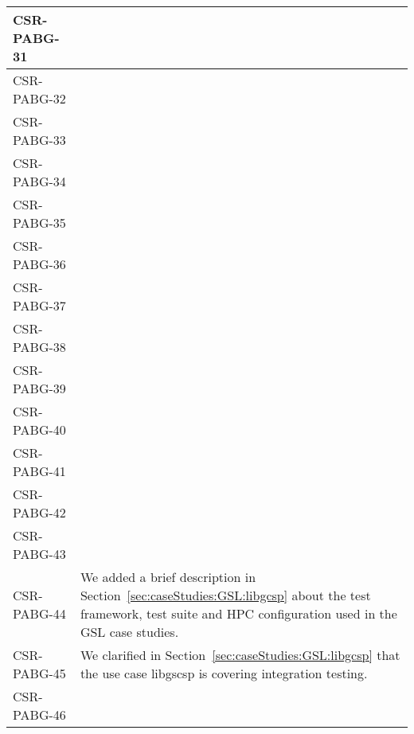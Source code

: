 \begin{longtable}{|p{1.5cm}|p{12cm}|@{}}
\hline
CSR-PABG-31&
\begin{minipage}{12cm}
\end{minipage}\\
\hline
CSR-PABG-32&
\begin{minipage}{12cm}
\end{minipage}\\
\hline
CSR-PABG-33&
\begin{minipage}{12cm}
\end{minipage}\\
\hline
CSR-PABG-34&
\begin{minipage}{12cm}
\end{minipage}\\
\hline
CSR-PABG-35&
\begin{minipage}{12cm}
\end{minipage}\\
\hline
CSR-PABG-36&
\begin{minipage}{12cm}
\end{minipage}\\
\hline
CSR-PABG-37&
\begin{minipage}{12cm}
\end{minipage}\\
\hline
CSR-PABG-38&
\begin{minipage}{12cm}
\end{minipage}\\
\hline
CSR-PABG-39&
\begin{minipage}{12cm}
\end{minipage}\\
\hline
CSR-PABG-40&
\begin{minipage}{12cm}
\end{minipage}\\
\hline
CSR-PABG-41&
\begin{minipage}{12cm}
\end{minipage}\\
\hline
CSR-PABG-42&
\begin{minipage}{12cm}
\end{minipage}\\
\hline
CSR-PABG-43&
\begin{minipage}{12cm}
\end{minipage}\\
\hline
CSR-PABG-44&
\begin{minipage}{12cm}
We added a brief description in Section~\ref{sec:caseStudies:GSL:libgcsp} about the test framework, test suite and HPC configuration used in the GSL case studies.
\end{minipage}\\
\hline
CSR-PABG-45&
\begin{minipage}{12cm}
We clarified in Section~\ref{sec:caseStudies:GSL:libgcsp} that the use case libgscsp is covering integration testing.
\end{minipage}\\
\hline
CSR-PABG-46&
\begin{minipage}{12cm}


\end{minipage}
\end{longtable}
